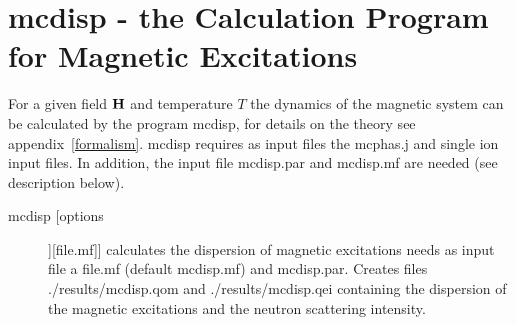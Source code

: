 
\section{{\prg mcdisp} - the Calculation Program for Magnetic Excitations}\label{mcdisp}

For a given field $\mathbf H$ and temperature $T$ the dynamics of the magnetic system
can be calculated by the program {\prg mcdisp}, for details
on the theory see appendix~\ref{formalism}. {\prg mcdisp} requires as input files
the {\prg mcphas.j} and single ion input files. In addition, the input file
{\prg mcdisp.par} and {\prg mcdisp.mf} are needed 
(see description below). 

\begin{description}
\item [\prg mcdisp [options]][file.mf]]  
      calculates the dispersion of magnetic excitations
	  needs as input file a {\prg file.mf} (default {\prg mcdisp.mf})
				and {\prg mcdisp.par}.  Creates  
				files {\prg ./results/mcdisp.qom} and {\prg ./results/mcdisp.qei}
				containing the dispersion of the magnetic excitations and the neutron
				scattering intensity. 
				

\end{description}
